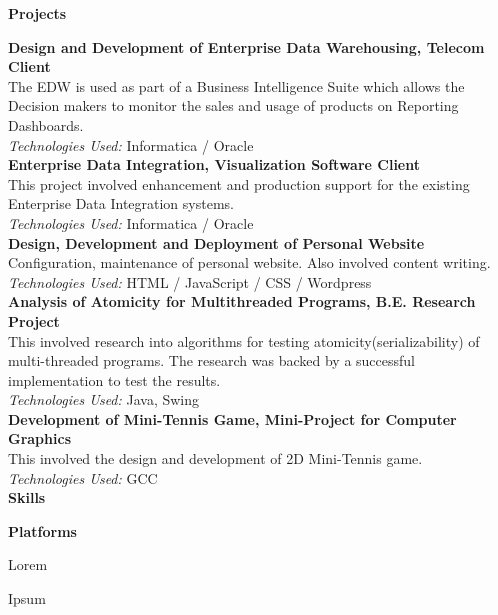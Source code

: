 \documentclass[a4paper,12pt,final]{memoir}
\newcommand{\Sep}{\vspace{1.5em}}
\newcommand{\SmallSep}{\vspace{0.5em}}
\newcommand{\CVSection}[1]
	{\Large\textbf{#1}\par
	\SmallSep\normalsize\normalfont}
\newcommand{\CVItem}[1]
	{\textbf{\color{Plum} #1}}
\begin{document}
\CVSection{Projects}
\CVItem{Design and Development of Enterprise Data Warehousing, Telecom Client}\\
{\footnotesize The EDW is used as part of a Business Intelligence Suite which allows the Decision makers to monitor the sales and usage of products on Reporting Dashboards.\\ \emph{Technologies Used:} Informatica / Oracle
}	
\SmallSep\\
\CVItem{Enterprise Data Integration, Visualization Software Client}\\
{\footnotesize This project involved enhancement and production support for the existing Enterprise Data Integration systems.\\ \emph{Technologies Used:} Informatica / Oracle}
\SmallSep\\
\CVItem{Design, Development and Deployment of Personal Website}\\
{\footnotesize Configuration, maintenance of personal website. Also involved content writing.\\\emph{Technologies Used:} HTML / JavaScript / CSS / Wordpress}%
\SmallSep\\
\CVItem{Analysis of Atomicity for Multithreaded Programs, B.E. Research Project}\\
{\footnotesize This involved research into algorithms for testing atomicity(serializability) of multi-threaded programs. The research was backed by a successful implementation to test the results.\\
\emph{Technologies Used:} Java\texttrademark, Swing}%
\SmallSep\\
\CVItem{Development of Mini-Tennis Game, Mini-Project for Computer Graphics}\\
{\footnotesize This involved the design and development of 2D Mini-Tennis game.\\ \emph{Technologies Used:} GCC}\\%

\CVSection{Skills}
\CVItem{Platforms}
\begin{multicols}{1}
\begin{compactitem}[\color{Plum}$\circ$]
	\item Lorem 
	\item Ipsum 
\end{compactitem}
\end{multicols}
\SmallSep
\end{document}
